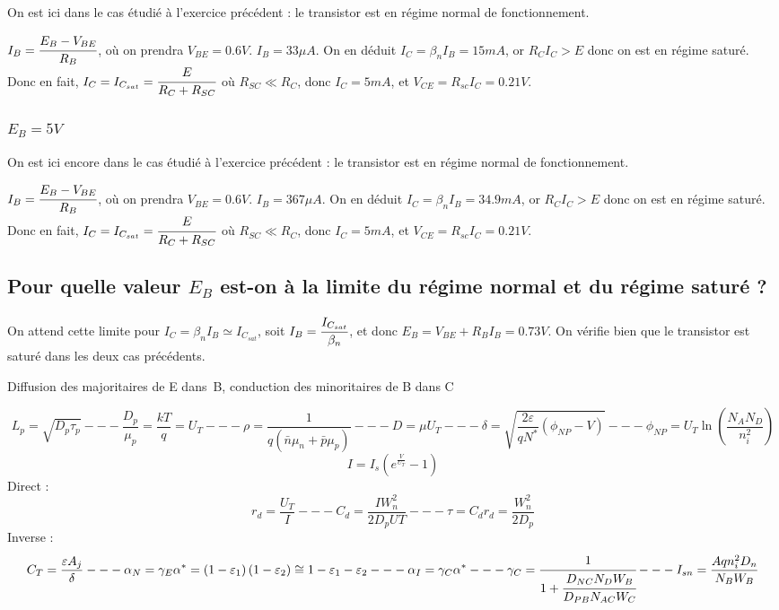 \documentclass[10pt]{article}
\begin{document}
    On est ici dans le cas étudié à l'exercice précédent : le transistor est en régime normal de fonctionnement.

    $I_B = \cfrac{E_B-V_{BE}}{R_B}$, où on prendra $V_{BE} = 0.6V$. $I_B = 33\mu A$. On en déduit $I_C = \beta_n I_B = 15mA$, or $R_C I_C > E$ donc on est en régime saturé. Donc en fait, $I_C = I_{C_{sat}} = \cfrac{E}{R_C+R_{SC}}$ où $R_{SC} \ll R_C$, donc $I_C = 5mA$, et $V_{CE} = R_{sc} I_C = 0.21V$.

   \subsubsection{$E_B=5V$}

    On est ici encore dans le cas étudié à l'exercice précédent : le transistor est en régime normal de fonctionnement.

    $I_B = \cfrac{E_B-V_{BE}}{R_B}$, où on prendra $V_{BE} = 0.6V$. $I_B = 367\mu A$. On en déduit $I_C = \beta_n I_B = 34.9mA$, or $R_C I_C > E$ donc on est en régime saturé. Donc en fait, $I_C = I_{C_{sat}} = \cfrac{E}{R_C+R_{SC}}$ où $R_{SC} \ll R_C$, donc $I_C = 5mA$, et $V_{CE} = R_{sc} I_C = 0.21V$.

  \subsection{Pour quelle valeur $E_B$ est-on à la limite du régime normal et du régime saturé ?}

   On attend cette limite pour $I_C = \beta_n I_B \simeq I_{C_{sat}}$, soit $I_B = \cfrac{I_{C_{sat}}}{\beta_n}$, et donc $E_B = V_{BE} +R_B I_B = 0.73V$. On vérifie bien que le transistor est saturé dans les deux cas précédents.

Diffusion des majoritaires de E dans B, conduction des minoritaires de B dans C


$$L_{p} = \sqrt{D_{p}\tau_{p}} --- \frac{D_{p}}{\mu_{p}} = \frac{kT}{q} = U_{T} --- \rho = \frac{1}{q(\bar{n}\mu_{n}+\bar{p}\mu_{p})} --- D=\mu U_{T} --- \delta=\sqrt{\frac{2\varepsilon}{qN^{*}}\left(\phi_{NP}-V\right)} --- \phi_{NP} = U_{T}\ln\left(\frac{N_{A}N_{D}}{n_{i}^{2}}\right) $$
$$I=I_{s}\left(e^{\frac{V}{U_{T}}}-1\right)$$
Direct : 
$$r_{d}=\frac{U_{T}}{I} --- C_{d} = \frac{IW_{n}^{2}}{2D_{p}U{T}} --- \tau = C_{d}r_{d} = \frac{W_{n}^{2}}{2D_{p}}$$
Inverse : 
$$C_{T} = \frac{\varepsilon A_{j}}{\delta} --- \alpha_{N}=\gamma_{E}\alpha^{*}=\left(1-\varepsilon_{1}\right)\left(1-\varepsilon_{2}\right)\cong 1-\varepsilon_{1}-\varepsilon_{2} --- \alpha_{I}=\gamma_{C}\alpha^{*} --- \gamma_{C} = \cfrac{1}{1+\cfrac{D_{NC}N_{D}W_{B}}{D_{PB}N_{AC}W_{C}}} --- I_{sn}=\frac{Aqn_{i}^{2}D_{n}}{N_{B}W_{B}}$$
\end{document}
